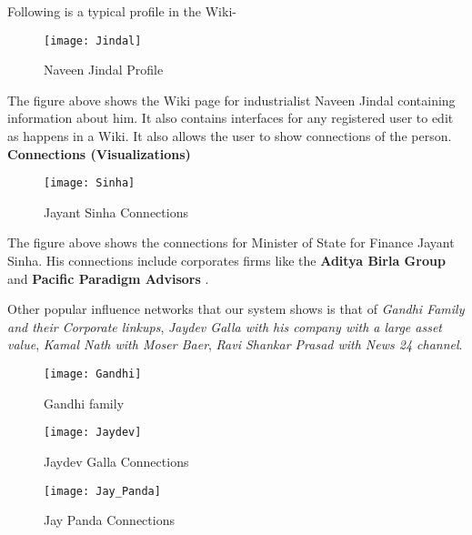 Following is a typical profile in the Wiki-

\begin{figure}[here]
\begin{center}	
\texttt{[image: Jindal]} 
\caption{Naveen Jindal Profile}
\label{fig:jindal}
\end{center}
\end{figure}

The figure above shows the Wiki page for industrialist Naveen Jindal containing information about him. It also contains interfaces for any registered user to edit as happens in a Wiki. It also allows the user to show connections of the person.\\

\textbf{Connections (Visualizations)}\\

\begin{figure}[here]
\begin{center}	
\texttt{[image: Sinha]} 
\caption{Jayant Sinha Connections}
\label{fig:sinha}
\end{center}
\end{figure}
The figure above shows the connections for Minister of State for Finance Jayant Sinha. His connections include corporates firms like the \textbf{Aditya Birla Group} and \textbf{Pacific Paradigm Advisors} .

Other popular influence networks that our system shows is that of \emph{Gandhi Family and their Corporate linkups}, \emph{Jaydev Galla with his company with a large asset value}, \emph{Kamal Nath with Moser Baer}, \emph{Ravi Shankar Prasad with News 24 channel}.

\begin{figure}[here]
\begin{center}	
\texttt{[image: Gandhi]} 
\caption{Gandhi family}
\label{fig:gandhi}
\end{center}
\end{figure}

\begin{figure}[here]
\begin{center}	
\texttt{[image: Jaydev]} 
\caption{Jaydev Galla Connections}
\label{fig:jaydev}
\end{center}
\end{figure}

\begin{figure}[here]
\begin{center}	
\texttt{[image: Jay\_Panda]} 
\caption{Jay Panda Connections}
\label{fig:jaypanda}
\end{center}
\end{figure}

